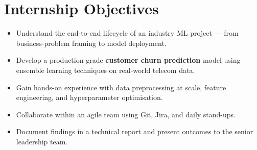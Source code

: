 \section{Internship Objectives}

\begin{itemize}[leftmargin=18pt,itemsep=4pt,topsep=4pt]
    \item Understand the end-to-end lifecycle of an industry ML project --- from
          business-problem framing to model deployment.
    \item Develop a production-grade \textbf{customer churn prediction} model using
          ensemble learning techniques on real-world telecom data.
    \item Gain hands-on experience with data preprocessing at scale, feature
          engineering, and hyperparameter optimisation.
    \item Collaborate within an agile team using Git, Jira, and daily stand-ups.
    \item Document findings in a technical report and present outcomes to the
          senior leadership team.
\end{itemize}


